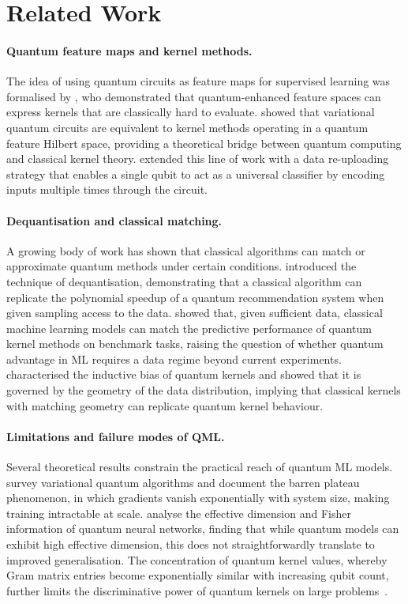\section{Related Work}
\label{sec:related}

\paragraph{Quantum feature maps and kernel methods.}
The idea of using quantum circuits as feature maps for supervised learning
was formalised by \citet{havlicek2019}, who demonstrated that quantum-enhanced
feature spaces can express kernels that are classically hard to evaluate.
\citet{schuld2019} showed that variational quantum circuits are equivalent to
kernel methods operating in a quantum feature Hilbert space, providing a
theoretical bridge between quantum computing and classical kernel theory.
\citet{perez2020} extended this line of work with a data re-uploading strategy
that enables a single qubit to act as a universal classifier by encoding inputs
multiple times through the circuit.

\paragraph{Dequantisation and classical matching.}
A growing body of work has shown that classical algorithms can match or
approximate quantum methods under certain conditions.
\citet{tang2019} introduced the technique of dequantisation, demonstrating
that a classical algorithm can replicate the polynomial speedup of a quantum
recommendation system when given sampling access to the data.
\citet{huang2021} showed that, given sufficient data, classical machine
learning models can match the predictive performance of quantum kernel methods
on benchmark tasks, raising the question of whether quantum advantage in ML
requires a data regime beyond current experiments.
\citet{kubler2021} characterised the inductive bias of quantum kernels and
showed that it is governed by the geometry of the data distribution, implying
that classical kernels with matching geometry can replicate quantum kernel
behaviour.

\paragraph{Limitations and failure modes of QML.}
Several theoretical results constrain the practical reach of quantum ML models.
\citet{cerezo2021} survey variational quantum algorithms and document the
barren plateau phenomenon, in which gradients vanish exponentially with system
size, making training intractable at scale.
\citet{abbas2021} analyse the effective dimension and Fisher information of
quantum neural networks, finding that while quantum models can exhibit high
effective dimension, this does not straightforwardly translate to improved
generalisation.
The concentration of quantum kernel values, whereby Gram matrix entries become
exponentially similar with increasing qubit count, further limits the
discriminative power of quantum kernels on large
problems~\citep{thanasilp2022}.

